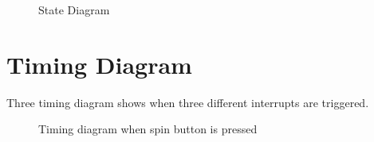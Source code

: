 \documentclass[a4paper,13pt,openany,sffamily]{memoir}
\begin{document}
\begin{figure}[h]
\caption{State Diagram }
\label{Fig_State_Diagram}
\end{figure}

\newpage
\section{Timing Diagram}
Three timing diagram shows when three different interrupts are triggered.   

\begin{figure}[h]
\caption{Timing diagram when spin button is pressed }
\label{Fig_Spin_Timing}
\end{figure}
\end{document}
